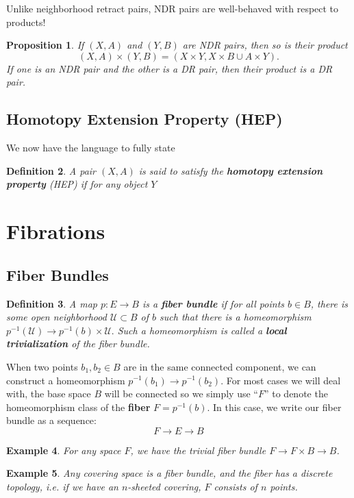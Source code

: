 \documentclass[12pt]{article}
\newtheorem{definition}{Definition}[subsection]
\newtheorem{proposition}[definition]{Proposition}
\newtheorem{example}[definition]{Example}
\begin{document}
Unlike neighborhood retract pairs, NDR pairs are well-behaved with respect to products!

\begin{proposition}
  If $(X,A)$ and $(Y,B)$ are NDR pairs, then so is their product
  \[(X,A)\times (Y, B) = (X\times Y, X\times B\cup A\times Y).\]
  If one is an NDR pair and the other is a DR pair, then their product is a DR pair.
\end{proposition}

\subsection{Homotopy Extension Property (HEP)}
We now have the language to fully state 

\begin{definition}
  A pair $(X,A)$ is said to satisfy the \textbf{homotopy extension property} (HEP) if for any object $Y$
\end{definition}

\section{Fibrations}

\subsection{Fiber Bundles}

\begin{definition}
  A map $p : E \to B$ is a \textbf{fiber bundle} if for all points $b\in B$, there is some open neighborhood $\mathcal{U}\subset B$ of $b$ such that there is a homeomorphism $p^{-1}(\mathcal{U}) \to p^{-1}(b)\times \mathcal{U}.$ Such a homeomorphism is called a \textbf{local trivialization} of the fiber bundle.
\end{definition}

When two points $b_1, b_2\in B$ are in the same connected component, we can construct a homeomorphism $p^{-1}(b_1)\to p^{-1}(b_2)$. For most cases we will deal with, the base space $B$ will be connected so we simply use ``$F$'' to denote the homeomorphism class of the \textbf{fiber} $F = p^{-1}(b)$. 
In this case, we write our fiber bundle as a sequence:
\[
    F \to E \to B
\]
\begin{example}
  For any space $F$, we have the trivial fiber bundle $F \to F\times B \to B$.
\end{example}

\begin{example}
  Any covering space is a fiber bundle, and the fiber has a discrete topology, i.e. if we have an $n$-sheeted covering, $F$ consists of $n$ points.
\end{example}
\end{document}
